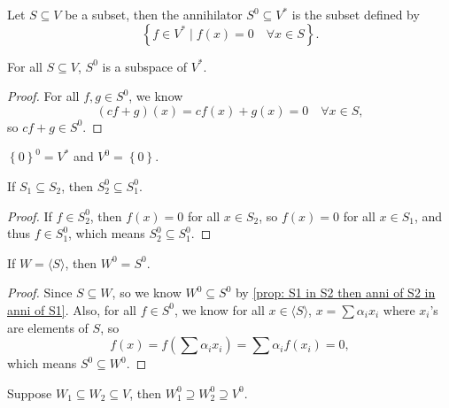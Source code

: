 \begin{definition}[Annihilator] \label{def: annihilator}
    Let \(S \subseteq V\) be a subset, then the annihilator \(S^0 \subseteq V^*\) is the subset defined by 
    \[
        \left\{ f \in V^* \mid f(x) = 0 \quad \forall x \in S\right\}. 
    \]  
\end{definition}

\begin{proposition}
    For all \(S \subseteq V\), \(S^0 \) is a subspace of \(V^*\).  
\end{proposition}
\begin{proof}
    For all \(f, g \in S^0\), we know 
    \[
        (cf + g)(x) = cf(x) + g(x) = 0 \quad \forall x \in S,
    \] so \(cf + g \in S^0\). 
\end{proof}

\begin{eg}
    \(\left\{ 0 \right\}^0 = V^* \) and \(V^0 = \left\{ 0 \right\} \).  
\end{eg}

\begin{proposition} \label{prop: S1 in S2 then anni of S2 in anni of S1}
    If \(S_1 \subseteq S_2\), then \(S_2^0 \subseteq S_1^0\).  
\end{proposition}
\begin{proof}
    If \(f \in S_2^0\), then \(f(x) = 0\) for all \(x \in S_2\), so \(f(x) = 0\) for all \(x \in S_1\), and thus \(f \in S_1^0\), which means \(S_2^0 \subseteq S_1^0\).       
\end{proof}

\begin{proposition}
    If \(W = \langle S \rangle \), then \(W^0 = S^0\).  
\end{proposition}
\begin{proof}
    Since \(S \subseteq W\), so we know \(W^0 \subseteq S^0\) by \autoref{prop: S1 in S2 then anni of S2 in anni of S1}. Also, for all \(f \in S^0\), we know for all \(x \in \langle S \rangle \), \(x = \sum \alpha _i x_i \) where \(x_i\)'s are elements of \(S\), so
    \[
        f(x) = f \left( \sum \alpha _i x_i  \right) = \sum \alpha _i f(x_i) = 0,  
    \] which means \(S^0 \subseteq W^0\).       
\end{proof}

\begin{eg}
    Suppose \(W_1 \subseteq W_2 \subseteq V\), then \(W_1^0 \supseteq W_2^0 \supseteq V^0\). 
\end{eg}

